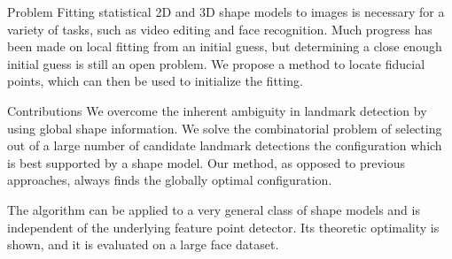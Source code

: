 \documentclass[portrait,final,a0paper,fontscale=0.277]{baposter}
\begin{document}
\begin{poster}
  \begin{posterbox}[name=problem,column=0,row=0]{Problem}
  Fitting statistical 2D and 3D shape models to images is necessary for a
  variety of tasks, such as video editing and face recognition. Much progress
  has been made on local fitting from an initial guess, but determining a close
  enough initial guess is still an open problem. We propose a method to locate
  fiducial points, which can then be used to initialize the fitting.
 \end{posterbox}

  \begin{posterbox}[name=contribution,column=0,below=problem]{Contributions}
  We overcome the inherent ambiguity in landmark detection by using global shape
  information. We solve the  combinatorial problem of selecting out of a large
  number of candidate landmark detections the configuration which is best
  supported by a shape model. Our method, as opposed to previous approaches,
  always finds the globally optimal configuration.

  The algorithm can be applied to a very general class of shape models and is
  independent of the underlying feature point detector. Its theoretic optimality
  is shown, and it is evaluated on a large face dataset.
  \end{posterbox}


\end{poster}
\end{document}
